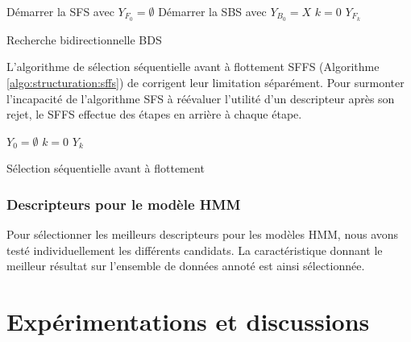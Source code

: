 \begin{algorithm}[H]
	Démarrer la SFS avec $Y_{F_0}= \emptyset $\; 
	Démarrer la SBS avec $Y_{B_0}=X$\; $k=0$\;
	\Return $Y_{F_k}$\;
	\caption{Recherche bidirectionnelle BDS} \label{algo:structuration:bds}
\end{algorithm}

L'algorithme de sélection séquentielle avant à flottement SFFS (Algorithme \ref{algo:structuration:sffs}) de \citet{pudil1994floatingFeatSelection} corrigent leur limitation séparément. Pour surmonter l'incapacité de l'algorithme SFS à réévaluer l'utilité d'un descripteur après son rejet, le SFFS effectue des étapes en arrière à chaque étape. 

\begin{algorithm}[H]
	$Y_0= \emptyset $\; 
	$k=0$\;
	\Return $Y_k$\;
	\caption{Sélection séquentielle avant à flottement}\label{algo:structuration:sffs}
\end{algorithm}

\subsubsection{Descripteurs pour le modèle HMM} Pour sélectionner les meilleurs descripteurs pour les modèles HMM, nous avons testé individuellement les différents candidats. La caractéristique donnant le meilleur résultat sur l'ensemble de données annoté est ainsi sélectionnée.

\section{Expérimentations et discussions}

